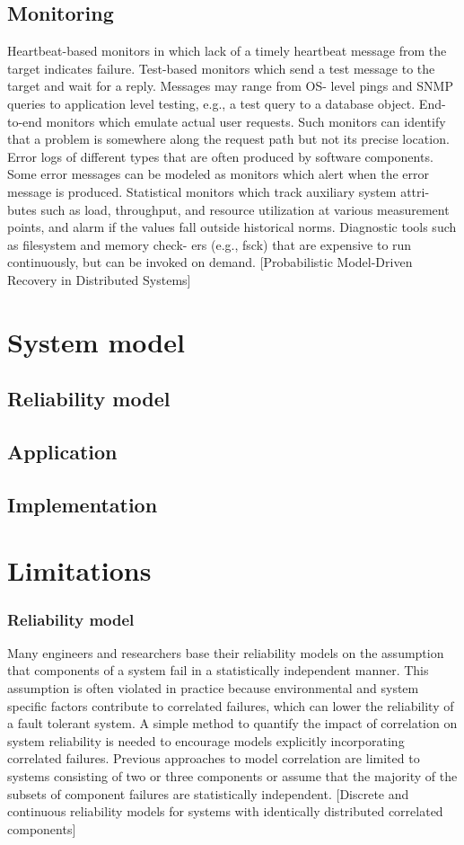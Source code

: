 \documentclass{cslthse-msc}
\begin{document}
\section{Monitoring}
Heartbeat-based monitors in which lack of a timely heartbeat message from the target indicates failure.
Test-based monitors which send a test message to the target and wait for a reply. Messages may range from OS- level pings and SNMP queries to application level testing, e.g., a test query to a database object.
End-to-end monitors which emulate actual user requests. Such monitors can identify that a problem is somewhere along the request path but not its precise location.
Error logs of different types that are often produced by software components. Some error messages can be modeled as monitors which alert when the error message is produced.
Statistical monitors which track auxiliary system attri- butes such as load, throughput, and resource utilization at various measurement points, and alarm if the values fall outside historical norms.
Diagnostic tools such as filesystem and memory check- ers (e.g., fsck) that are expensive to run continuously, but can be invoked on demand. [Probabilistic Model-Driven Recovery in Distributed Systems]

\chapter{System model}
\section{Reliability model}
\section{Application}
\section{Implementation} \label{sec:implementation}

\chapter{Limitations} \label{ch:limitations}
\subsection{Reliability model} \label{sec:limitations_reliability_model}
Many engineers and researchers base their reliability models on the assumption that components of a system fail in a statistically independent manner. This assumption is often violated in practice because environmental and system specific factors contribute to correlated failures, which can lower the reliability of a fault tolerant system. A simple method to quantify the impact of correlation on system reliability is needed to encourage models explicitly incorporating correlated failures. Previous approaches to model correlation are limited to systems consisting of two or three components or assume that the majority of the subsets of component failures are statistically independent. [Discrete and continuous reliability models for systems with identically distributed correlated components]
\end{document}
